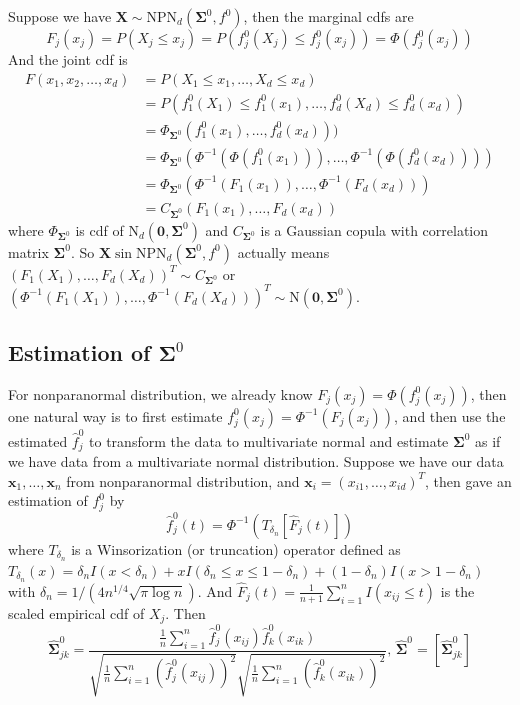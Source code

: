 \documentclass{article}
\theoremstyle{definition}
\begin{document}
	Suppose we have $\bm X \sim \mathrm{NPN}_d(\bm \Sigma^0, f^0)$, then the marginal cdfs are
	\[F_j(x_j) = P(X_j \leq x_j) = P(f_j^0(X_j) \leq f_j^0(x_j)) = \Phi(f_j^0(x_j))\]
	And the joint cdf is
	\begin{align*}
	F(x_1, x_2, \ldots, x_d) &= P(X_1 \leq x_1, \ldots, X_d \leq x_d) \\
	& = P(f_1^0(X_1) \leq f_1^0(x_1) ,\ldots, f_d^0(X_d) \leq f_d^0(x_d)) \\
	& = \Phi_{\bm \Sigma^0}(f_1^0(x_1), \ldots, f_d^0(x_d)))\\
	& = \Phi_{\bm \Sigma^0} (\Phi^{-1}(\Phi(f_1^0(x_1))), \ldots, \Phi^{-1}(\Phi(f_d^0(x_d))))\\
	& = \Phi_{\bm \Sigma^0}(\Phi^{-1}(F_1(x_1)), \ldots, \Phi^{-1}(F_d(x_d)))\\
	& = C_{\bm \Sigma^0}(F_1(x_1),\ldots, F_d(x_d))
		\end{align*}
		where $\Phi_{\bm \Sigma^{0}}$ is cdf of $\mathrm{N}_d(\bm 0, \bm \Sigma^{0})$ and $C_{\bm \Sigma^0}$ is a Gaussian copula with correlation matrix $\bm \Sigma^{0}$. So $\bm X \sin \mathrm{NPN}_d(\bm \Sigma^0, f^0)$ actually means $(F_1(X_1), \ldots, F_d(X_d))^T \sim C_{\bm \Sigma^0}$ or $(\Phi^{-1}(F_1(X_1)), \ldots, \Phi^{-1}(F_d(X_d)))^T \sim \mathrm{N}(\bm 0, \bm \Sigma^0)$. 

	\subsection{Estimation of $\bm \Sigma^0$}
	For nonparanormal distribution, we already know $F_j(x_j) = \Phi(f_j^0(x_j))$, then one natural way is to first estimate $f_j^0(x_j) = \Phi^{-1}(F_j(x_j))$, and then use the estimated $\hat{f}_j^0$ to transform the data to multivariate normal and estimate $\bm \Sigma^0$ as if we have data from a multivariate normal distribution. Suppose we have our data $\bm x_1, \ldots, \bm x_n$ from nonparanormal distribution, and $\bm x_i = (x_{i1}, \ldots, x_{id})^T$, then \cite{liu2012nonparanormal} gave an estimation of $f_j^0$ by
	\[\hat{f}_j^0 (t) = \Phi^{-1}\left(T_{\delta_n} [\hat{F}_j(t)]\right)\]
	where $T_{\delta_n}$ is a Winsorization (or truncation) operator defined as $T_{\delta_n}(x) = \delta_n I(x < \delta_n) + x I(\delta_n \leq x \leq 1 - \delta_n) + (1 - \delta_n) I(x > 1 - \delta_n)$ with $\delta_n = 1/(4n^{1/4} \sqrt{\pi \log n})$. And $\hat{F}_j(t) = \frac{1}{n+1} \sum_{i=1}^n I(x_{ij} \leq t)$ is the scaled empirical cdf of $X_j$. Then 
	\[\hat{\bm \Sigma}^0_{jk} = \frac{\frac{1}{n} \sum_{i=1}^n \hat{f}_j^0(x_{ij}) \hat{f}_{k}^0 (x_{ik})}{\sqrt{\frac{1}{n} \sum_{i=1}^n \left(\hat{f}_j^0 (x_{ij})\right)^2}\sqrt{\frac{1}{n} \sum_{i=1}^n \left(\hat{f}_k^0 (x_{ik})\right)^2}},\, \hat{\bm \Sigma}^0 = [\hat{\bm \Sigma}_{jk}^0]\]
\end{document}
